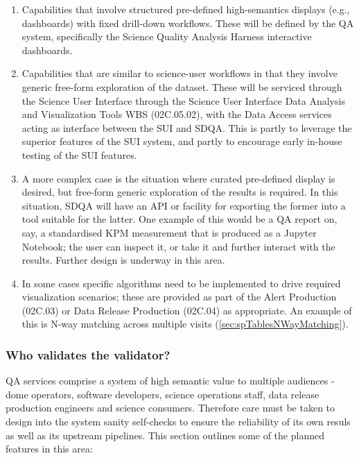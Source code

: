 \begin{enumerate}

\item Capabilities that involve structured pre-defined high-semantics displays (e.g., dashboards) with fixed drill-down workflows. These will be defined by the QA system, specifically the Science Quality Analysis Harness interactive dashboards.

\item Capabilities that are similar to science-user workflows in that they involve generic free-form exploration of the dataset. These will be serviced through the Science User Interface through the Science User Interface Data Analysis and Visualization Tools WBS (02C.05.02), with the Data Access services acting as interface between the SUI and SDQA. This is partly to leverage the superior features of the SUI system, and partly to encourage early in-house testing of the SUI features.

\item A more complex case is the situation where curated pre-defined display is desired, but free-form generic exploration of the results is required. In this situation, SDQA will have an API or facility for exporting the former into a tool suitable for the latter. One example of this would be a QA report on, say, a standardised KPM measurement that is produced as a Jupyter Notebook; the user can inspect it, or take it and further interact with the results. Further design is underway in this area.

\item In some cases specific algorithms need to be implemented to drive required visualization scenarios; these are provided as part of the Alert Production (02C.03) or Data Release Production (02C.04) as appropriate. An example of this is N-way matching across multiple visits (\ref{sec:spTablesNWayMatching}).

\end{enumerate}

\subsubsection{Who validates the validator?}
\label{sec:qaSelfValidation}

QA services comprise a system of high semantic value to multiple audiences - dome operators, software developers, science operations staff, data release production engineers and science consumers. Therefore care must be taken to design into the system sanity self-checks to ensure the reliability of its own resuls as well as its upstream pipelines. This section outlines some of the planned features in this area:

